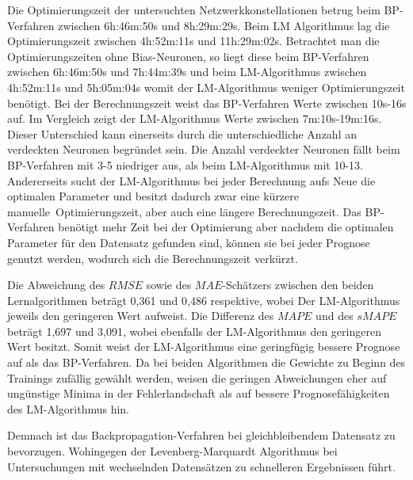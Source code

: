Die Optimierungszeit der untersuchten Netzwerkkonstellationen betrug beim BP-Verfahren zwischen 6h:46m:50s und 8h:29m:29s. Beim LM Algorithmus lag die Optimierungszeit zwischen 4h:52m:11s und 11h:29m:02s. Betrachtet man die Optimierungszeiten ohne Bias-Neuronen, so liegt diese beim BP-Verfahren zwischen 6h:46m:50s und 7h:44m:39s und beim LM-Algorithmus zwischen 4h:52m:11s und 5h:05m:04s womit der LM-Algorithmus weniger Optimierungszeit benötigt. Bei der Berechnungszeit weist das BP-Verfahren Werte zwischen 10s-16s auf. Im Vergleich zeigt der LM-Algorithmus Werte zwischen 7m:10s-19m:16s. Dieser Unterschied kann einerseits durch die unterschiedliche Anzahl an verdeckten Neuronen begründet sein. Die Anzahl verdeckter Neuronen fällt beim BP-Verfahren mit 3-5 niedriger aus, als beim LM-Algorithmus mit 10-13. Andererseits sucht der LM-Algorithmus bei jeder Berechnung aufs Neue die optimalen Parameter und besitzt dadurch zwar eine kürzere \glqq manuelle\grqq~Optimierungszeit, aber auch eine längere Berechnungszeit. Das BP-Verfahren benötigt mehr Zeit bei der Optimierung aber nachdem die optimalen Parameter für den Datensatz gefunden sind, können sie bei jeder Prognose genutzt werden, wodurch sich die Berechnungszeit verkürzt.\par\medskip

Die Abweichung des $RMSE$ sowie des $MAE$-Schätzers zwischen den beiden Lernalgorithmen beträgt 0,361 und 0,486 respektive, wobei Der LM-Algorithmus jeweils den geringeren Wert aufweist. Die Differenz des $MAPE$ und des $sMAPE$ beträgt 1,697 und 3,091, wobei ebenfalls der LM-Algorithmus den geringeren Wert besitzt. Somit weist der LM-Algorithmus eine geringfügig bessere Prognose auf als das BP-Verfahren. Da bei beiden Algorithmen die Gewichte zu Beginn des Trainings zufällig gewählt werden, weisen die geringen Abweichungen eher auf ungünstige Minima in der Fehlerlandschaft als auf bessere Prognosefähigkeiten des LM-Algorithmus hin.\par\medskip

Demnach ist das Backpropagation-Verfahren bei gleichbleibendem Datensatz zu bevorzugen. Wohingegen der Levenberg-Marquardt Algorithmus bei Untersuchungen mit wechselnden Datensätzen zu schnelleren Ergebnissen führt.



